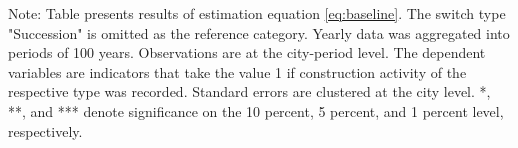 \begin{table}[htbp]
\begin{tabular}{lcccc}
      
   \end{tabular}
   
   \par \raggedright 
   Note: Table presents results of estimation equation \eqref{eq:baseline}. The switch type "Succession" is omitted as the  reference category. Yearly data was aggregated into periods of 100 years. Observations are at the city-period  level. The dependent variables are indicators that take the value 1 if  construction activity of the respective type was recorded. Standard errors are  clustered at the city level. *, **, and *** denote significance on the 10 percent, 5 percent, and 1 percent  level, respectively.
\end{table}
